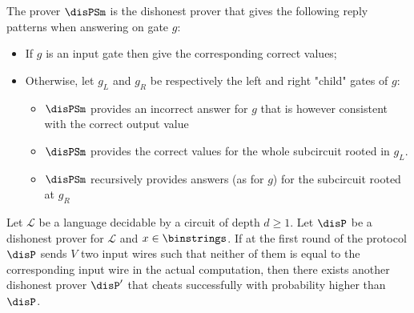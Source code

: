 \begin{mydef}
The prover $\disPSm$ is the dishonest prover that gives the following reply 
patterns when answering on gate $g$:
\begin{itemize}
\item If $g$ is an input gate then give the corresponding correct values;
\item Otherwise, let $g_L$ and $g_R$ be respectively the left and right "child" 
gates of $g$:
\begin{itemize}
\item $\disPSm$ provides an incorrect answer for $g$ that is however consistent 
with the correct output value 
\item $\disPSm$ provides the correct values for the whole subcircuit rooted in 
$g_L$.
\item $\disPSm$ recursively provides answers (as for $g$) for the subcircuit 
rooted at $g_R$
\end{itemize}
\end{itemize}
\end{mydef}


\begin{mylemma}
Let $\mathcal{L}$ be a language decidable by a 
circuit of depth $d \geq 1$. Let $\disP$ be a dishonest prover for 
$\mathcal{L}$ and $x \in \binstrings$. If at the first round of the protocol 
$\disP$ 
sends $V$ two input wires such that neither of them is equal to the 
corresponding input wire in the actual computation, then there exists another 
dishonest prover $\disP'$ that cheats successfully with probability higher than 
$\disP$.
\end{mylemma}



